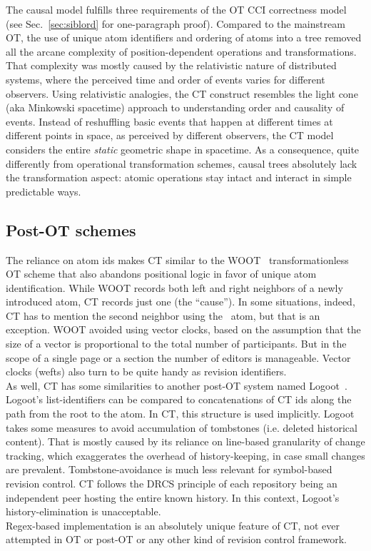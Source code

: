 \documentclass{sig-alternate}
\begin{document}
The causal model fulfills three requirements of the OT CCI correctness model (see Sec.~\ref{sec:siblord} for one-paragraph proof).
Compared to the mainstream OT, the use of unique atom identifiers and  ordering of atoms into a tree removed all the arcane complexity of position-dependent operations and transformations.
That complexity was mostly caused by the relativistic nature of distributed systems, where the perceived time and order of events varies for different observers.
Using relativistic analogies, the CT construct resembles the light cone (aka Minkowski spacetime) approach to understanding order and causality of events.
Instead of reshuffling basic events that happen at different times at different points in space, as perceived by different observers, the CT model considers the entire \emph{static} geometric shape in spacetime.
As a consequence, quite differently from operational transformation schemes, causal trees absolutely lack the transformation aspect: atomic operations stay intact and interact in simple predictable ways.

\subsection{Post-OT schemes}
The reliance on atom ids makes CT similar to the WOOT~\cite{woot} transformationless OT scheme that also abandons positional logic in favor of unique atom identification.
While WOOT records both left and right neighbors of a newly introduced atom, CT records just one (the ``cause''). 
In some situations, indeed, CT has to mention the second neighbor using the \zero ~atom, but that is an exception.
WOOT avoided using vector clocks, based on the assumption that the size of a vector is proportional to the total number of participants.
But in the scope of a single page or a section the number of editors is manageable. Vector clocks (wefts) also turn to be quite handy as revision identifiers. \\
As well, CT has some similarities to another post-OT system named Logoot~\cite{logoot}.
Logoot's list-identifiers can be compared to concatenations of CT ids along the path from the root to the atom.
In CT, this structure is used implicitly.
Logoot takes some measures to avoid accumulation of tombstones (i.e. deleted historical content). That is mostly caused by its reliance on line-based granularity of change tracking, which exaggerates the overhead of history-keeping, in case small changes are prevalent.
Tombstone-avoidance is much less relevant for symbol-based revision control.
CT follows the DRCS principle of each repository being an independent peer hosting the entire known history.
In this context, Logoot's history-elimination is unacceptable. \\
Regex-based implementation is an absolutely unique feature of CT, not ever attempted in OT or post-OT or any other kind of revision control framework.
\end{document}
